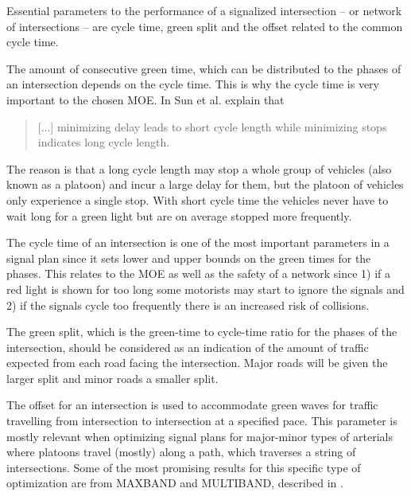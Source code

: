 \label{sec:theproblem}

Essential parameters to the performance of a signalized intersection
-- or network of intersections -- are cycle time, green split and the
offset related to the common cycle time.

The amount of consecutive green time, which can be distributed to the
phases of an intersection depends on the cycle time. This is why the
cycle time is very important to the chosen MOE. In \cite{41} Sun et
al. explain that 

\begin{quote}[...] minimizing delay leads to short cycle length while
minimizing stops indicates long cycle length.
\end{quote}

The reason is that a long cycle length may stop a whole group of
vehicles (also known as a platoon) and incur a large delay for them,
but the platoon of vehicles only experience a single stop. With short
cycle time the vehicles never have to wait long for a green light but
are on average stopped more frequently.


The cycle time of an intersection is one of the most important
parameters in a signal plan since it sets  lower and upper bounds on
the green times for the phases. This relates to the MOE as well as the
safety of a network since 1) if a red light is shown for too long some
motorists may start to ignore the signals and 2) if the signals
cycle too frequently there is an increased risk of collisions.

The green split, which is the green-time to cycle-time ratio for the
phases of the intersection, should be considered as an indication of
the amount of traffic expected from each road facing the
intersection. Major roads will be given the larger split and minor
roads a smaller split.

The offset for an intersection is used to accommodate green waves for
traffic travelling from intersection to intersection at a specified
pace. This parameter is mostly relevant when optimizing signal plans
for major-minor types of arterials where platoons travel (mostly)
along a path, which traverses a string of intersections. Some of the
most promising results for this specific type of optimization are from
MAXBAND and MULTIBAND, described in \cite{37}.

